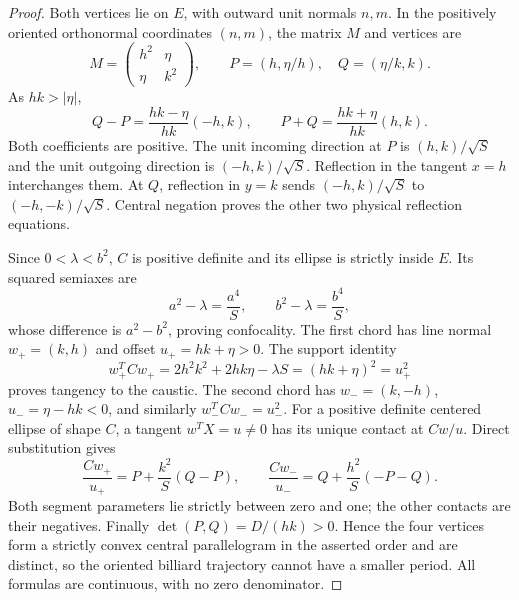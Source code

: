 \documentclass[11pt]{article}
\begin{document}
\begin{proof}
Both vertices lie on \(E\), with outward unit normals \(n,m\).
In the positively oriented orthonormal coordinates \((n,m)\), the matrix \(M\) and vertices are
\[
 M=\begin{pmatrix}h^2&\eta\\ \eta&k^2\end{pmatrix},\qquad
 P=(h,\eta/h),\quad Q=(\eta/k,k).
\]
As \(hk>|\eta|\),
\[
 Q-P=\frac{hk-\eta}{hk}(-h,k),\qquad
 P+Q=\frac{hk+\eta}{hk}(h,k).
\]
Both coefficients are positive. The unit incoming direction at \(P\) is \((h,k)/\sqrt S\) and the unit outgoing direction is \((-h,k)/\sqrt S\). Reflection in the tangent \(x=h\) interchanges them. At \(Q\), reflection in \(y=k\) sends \((-h,k)/\sqrt S\) to \((-h,-k)/\sqrt S\). Central negation proves the other two physical reflection equations.

Since \(0<\lambda<b^2\), \(C\) is positive definite and its ellipse is strictly inside \(E\). Its squared semiaxes are
\[
 a^2-\lambda=\frac{a^4}{S},\qquad b^2-\lambda=\frac{b^4}{S},
\]
whose difference is \(a^2-b^2\), proving confocality.
The first chord has line normal \(w_+=(k,h)\) and offset \(u_+=hk+\eta>0\).
The support identity
\[
 w_+^TCw_+=2h^2k^2+2hk\eta-\lambda S
           =(hk+\eta)^2=u_+^2
\]
proves tangency to the caustic. The second chord has \(w_-=(k,-h)\), \(u_-=\eta-hk<0\), and similarly \(w_-^TCw_-=u_-^2\).
For a positive definite centered ellipse of shape \(C\), a tangent \(w^TX=u\ne0\) has its unique contact at \(Cw/u\). Direct substitution gives
\[
 \frac{Cw_+}{u_+}=P+\frac{k^2}{S}(Q-P),\qquad
 \frac{Cw_-}{u_-}=Q+\frac{h^2}{S}(-P-Q).
\]
Both segment parameters lie strictly between zero and one; the other contacts are their negatives.
Finally \(\det(P,Q)=D/(hk)>0\). Hence the four vertices form a strictly convex central parallelogram in the asserted order and are distinct, so the oriented billiard trajectory cannot have a smaller period. All formulas are continuous, with no zero denominator.
\end{proof}
\end{document}
